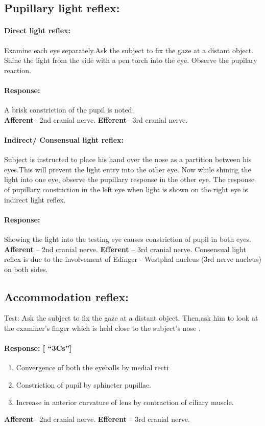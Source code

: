 \documentclass[a4paper,12pt,openany,twoside]{book}
\begin{document}
			\subsection*{Pupillary light reflex:}
			\paragraph{Direct light reflex:}Examine each eye separately.Ask the subject to fix the gaze at a distant object. Shine the light from the side with a pen torch into the eye. Observe the pupilary reaction.
			\paragraph{Response:} A brisk constriction of the pupil is noted.\\ 
			\textbf{Afferent}– 2nd cranial nerve.
			\textbf{Efferent}– 3rd cranial nerve.
			\paragraph{Indirect/ Consensual light reflex:}
			Subject is instructed to place his hand over the nose as a partition between his eyes.This will prevent the light entry into the other eye. Now while shining the light into one eye, observe the pupillary response in the other eye. The response of pupillary constriction in the left eye when light is shown on the right eye is indirect light reflex.
			\paragraph{Response:}
			Showing the light into the testing eye causes constriction of pupil in both eyes.\\ 
			\textbf{Afferent} 	– 	2nd cranial nerve.
			\textbf{Efferent} 	– 	3rd cranial nerve. 
			Consensual light reflex is due to the involvement of Edinger - Westphal nucleus           (3rd nerve nucleus) on both sides.
			\subsection*{Accommodation reflex:}
			Test: Ask the subject to fix the gaze at a distant object. Then,ask him to look at the examiner’s finger which is held close to the subject’s nose .
			\paragraph{Response: [ “3Cs”]}
			\begin{enumerate}
\item{Convergence of both the eyeballs by medial recti}
\item{Constriction of pupil by sphincter pupillae.}
\item{Increase in anterior curvature of lens by contraction of ciliary muscle. }
			\end{enumerate}
			\textbf{Afferent}– 2nd cranial nerve.
			\textbf{Efferent} – 3rd cranial nerve.
\end{document}
